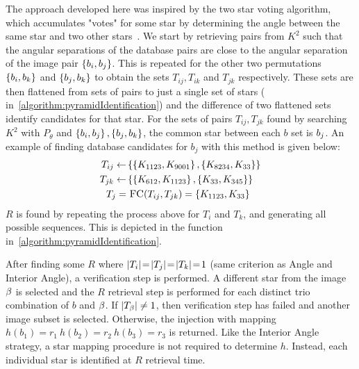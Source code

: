 The approach developed here was inspired by the two star voting algorithm, which accumulates "votes" for some star by
determining the angle between the same star and two other stars~\cite{tichy:preliminaryTestsCommericalImagers}.
We start by retrieving pairs from $K^2$ such that the angular separations of the database pairs are
close to the angular separation of the image pair $\left\{ b_i, b_j \right\}$.
This is repeated for the other two permutations $\left\{ b_i, b_k \right\}$ and $\left\{  b_j, b_k  \right\}$ to obtain
the sets $T_{ij}, T_{ik}$ and $T_{jk}$ respectively.
These sets are then flattened from sets of pairs to just a single set of stars (
in~\autoref{algorithm:pyramidIdentification}) and the difference of two flattened sets identify candidates for that
star.
For the sets of pairs $T_{ij}, T_{jk}$ found by searching $K^2$ with $P_\theta$ and $\left\{ b_i, b_j \right\},
\left\{ b_j, b_k \right\}$, the common star between each $b$ set is $b_j$.
An example of finding database candidates for $b_j$ with this method is given below:
\begin{equation}
    \begin{aligned}
        T_{ij} \gets& \set{ \set{\vv{K_{1123}}, \vv{K_{9001}}}, \set{\vv{K_{8234}}, \vv{K_{33}}} } \\
        T_{jk} \gets& \set{ \set{\vv{K_{612}}, \vv{K_{1123}}}, \set{\vv{K_{33}}, \vv{K_{345}}} } \\
        T_j =& \  \Call{FC}{T_{ij}, T_{jk}} = \set{\vv{K_{1123}}, \vv{K_{33}}}
    \end{aligned}
\end{equation}
$R$ is found by repeating the process above for $T_i$ and $T_k$, and generating all possible sequences.
This is depicted in the  function in~\autoref{algorithm:pyramidIdentification}.

After finding some $R$ where $\left| T_i \right| \!=\! \left| T_j \right| \!=\! \left| T_k \right| \!=\! 1$ (same criterion as Angle and
Interior Angle), a verification step is performed.
A different star from the image $\beta$ is selected and the $R$ retrieval step is performed for each distinct trio
combination of $b$ and $\beta$.
If $\left| T_\beta \right| \neq 1$, then verification step has failed and another image subset is selected.
Otherwise, the injection with mapping $h(b_1) = r_1 \ h(b_2) = r_2 \ h(b_3) = r_3$ is returned.
Like the Interior Angle strategy, a star mapping procedure is not required to determine $h$.
Instead, each individual star is identified at $R$ retrieval time.

